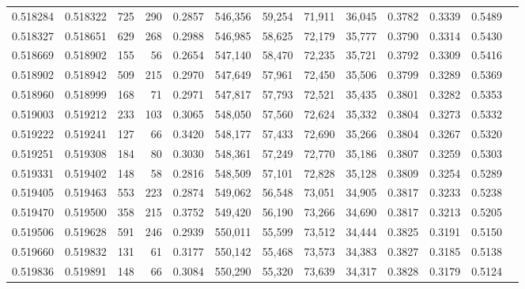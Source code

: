 \begin{tabular}{rrrrrrrrrrrrr}
0.518284 & 0.518322 &   725 &   290 &                                     0.2857 & 546,356 &  59,254 &  71,911 &  36,045 & 0.3782 & 0.3339 & 0.5489 \\
0.518327 & 0.518651 &   629 &   268 &                                     0.2988 & 546,985 &  58,625 &  72,179 &  35,777 & 0.3790 & 0.3314 & 0.5430 \\
0.518669 & 0.518902 &   155 &    56 &                                     0.2654 & 547,140 &  58,470 &  72,235 &  35,721 & 0.3792 & 0.3309 & 0.5416 \\
0.518902 & 0.518942 &   509 &   215 &                                     0.2970 & 547,649 &  57,961 &  72,450 &  35,506 & 0.3799 & 0.3289 & 0.5369 \\
0.518960 & 0.518999 &   168 &    71 &                                     0.2971 & 547,817 &  57,793 &  72,521 &  35,435 & 0.3801 & 0.3282 & 0.5353 \\
0.519003 & 0.519212 &   233 &   103 &                                     0.3065 & 548,050 &  57,560 &  72,624 &  35,332 & 0.3804 & 0.3273 & 0.5332 \\
0.519222 & 0.519241 &   127 &    66 &                                     0.3420 & 548,177 &  57,433 &  72,690 &  35,266 & 0.3804 & 0.3267 & 0.5320 \\
0.519251 & 0.519308 &   184 &    80 &                                     0.3030 & 548,361 &  57,249 &  72,770 &  35,186 & 0.3807 & 0.3259 & 0.5303 \\
0.519331 & 0.519402 &   148 &    58 &                                     0.2816 & 548,509 &  57,101 &  72,828 &  35,128 & 0.3809 & 0.3254 & 0.5289 \\
0.519405 & 0.519463 &   553 &   223 &                                     0.2874 & 549,062 &  56,548 &  73,051 &  34,905 & 0.3817 & 0.3233 & 0.5238 \\
0.519470 & 0.519500 &   358 &   215 &                                     0.3752 & 549,420 &  56,190 &  73,266 &  34,690 & 0.3817 & 0.3213 & 0.5205 \\
0.519506 & 0.519628 &   591 &   246 &                                     0.2939 & 550,011 &  55,599 &  73,512 &  34,444 & 0.3825 & 0.3191 & 0.5150 \\
0.519660 & 0.519832 &   131 &    61 &                                     0.3177 & 550,142 &  55,468 &  73,573 &  34,383 & 0.3827 & 0.3185 & 0.5138 \\
0.519836 & 0.519891 &   148 &    66 &                                     0.3084 & 550,290 &  55,320 &  73,639 &  34,317 & 0.3828 & 0.3179 & 0.5124 \\

\end{tabular}
